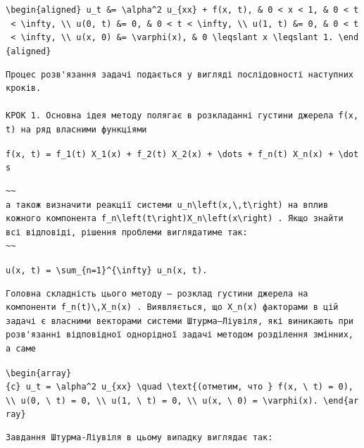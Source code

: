 \documentclass[
  ukrainian,
]{article}
\begin{document}
\texttt{\textbackslash{}begin\{aligned\}\ u\_t\ \&=\ \textbackslash{}alpha\^{}2\ u\_\{xx\}\ +\ f(x,\ t),\ \&\ 0\ \textless{}\ x\ \textless{}\ 1,\ \&\ 0\ \textless{}\ t\ \textless{}\ \textbackslash{}infty,\ \textbackslash{}\textbackslash{}\ u(0,\ t)\ \&=\ 0,\ \&\ 0\ \textless{}\ t\ \textless{}\ \textbackslash{}infty,\ \textbackslash{}\textbackslash{}\ u(1,\ t)\ \&=\ 0,\ \&\ 0\ \textless{}\ t\ \textless{}\ \textbackslash{}infty,\ \textbackslash{}\textbackslash{}\ u(x,\ 0)\ \&=\ \textbackslash{}varphi(x),\ \&\ 0\ \textbackslash{}leqslant\ x\ \textbackslash{}leqslant\ 1.\ \textbackslash{}end\{aligned\}}

\begin{verbatim}
Процес розв'язання задачі подається у вигляді послідовності наступних кроків.

КРОК 1. Основна ідея методу полягає в розкладанні густини джерела f(x, t) на ряд власними функціями
\end{verbatim}

\texttt{f(x,\ t)\ =\ f\_1(t)\ X\_1(x)\ +\ f\_2(t)\ X\_2(x)\ +\ \textbackslash{}dots\ +\ f\_n(t)\ X\_n(x)\ +\ \textbackslash{}dots}

\begin{verbatim}
~~
а також визначити реакції системи u_n\left(x,\,t\right) на вплив кожного компонента f_n\left(t\right)X_n\left(x\right) . Якщо знайти всі відповіді, рішення проблеми виглядатиме так:
~~
\end{verbatim}

\texttt{u(x,\ t)\ =\ \textbackslash{}sum\_\{n=1\}\^{}\{\textbackslash{}infty\}\ u\_n(x,\ t).}

\begin{verbatim}
Головна складність цього методу — розклад густини джерела на компоненти f_n(t)\,X_n(x) . Виявляється, що X_n(x) факторами в цій задачі є власними векторами системи Штурма–Ліувіля, які виникають при розв'язанні відповідної однорідної задачі методом розділення змінних, а саме
\end{verbatim}

\texttt{\textbackslash{}begin\{array\}\{c\}\ u\_t\ =\ \textbackslash{}alpha\^{}2\ u\_\{xx\}\ \textbackslash{}quad\ \textbackslash{}text\{(отметим,\ что\ \}\ f(x,\ \textbackslash{}\ t)\ =\ 0),\ \textbackslash{}\textbackslash{}\ u(0,\ \textbackslash{}\ t)\ =\ 0,\ \textbackslash{}\textbackslash{}\ u(1,\ \textbackslash{}\ t)\ =\ 0,\ \textbackslash{}\textbackslash{}\ u(x,\ \textbackslash{}\ 0)\ =\ \textbackslash{}varphi(x).\ \textbackslash{}end\{array\}}

\begin{verbatim}
Завдання Штурма-Ліувіля в цьому випадку виглядає так:
\end{verbatim}
\end{document}
